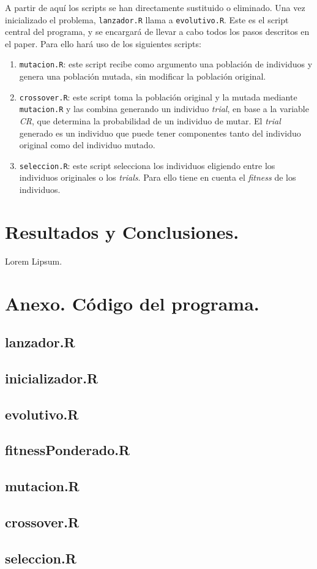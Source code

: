 \documentclass{article}
\begin{document}
A partir de aquí los scripts se han directamente sustituido o eliminado. Una vez inicializado el problema, \texttt{lanzador.R} llama a \texttt{evolutivo.R}. Este es el script central del programa, y se encargará de llevar a cabo todos los pasos descritos en el paper\cite{mainPaper}. Para ello hará uso de los siguientes scripts:
\begin{enumerate}
    \item \texttt{mutacion.R}: este script recibe como argumento una población de individuos y genera una población mutada, sin modificar la población original.
    \item \texttt{crossover.R}: este script toma la población original y la mutada mediante \texttt{mutacion.R} y las combina generando un individuo \textit{trial}, en base a la variable \textit{CR}, que determina la probabilidad de un individuo de mutar. El \textit{trial} generado es un individuo que puede tener componentes tanto del individuo original como del individuo mutado.
    \item \texttt{seleccion.R}: este script selecciona los individuos eligiendo entre los individuos originales o los \textit{trials}. Para ello tiene en cuenta el \textit{fitness} de los individuos.
    \end{enumerate}

\section{Resultados y Conclusiones.}
Lorem Lipsum.

\vspace{5cm}

{}


\newpage

\section{Anexo. Código del programa.} 

\subsection{lanzador.R}

\subsection{inicializador.R}

\subsection{evolutivo.R}

\subsection{fitnessPonderado.R}

\subsection{mutacion.R}

\subsection{crossover.R}

\subsection{seleccion.R}

\end{document}
